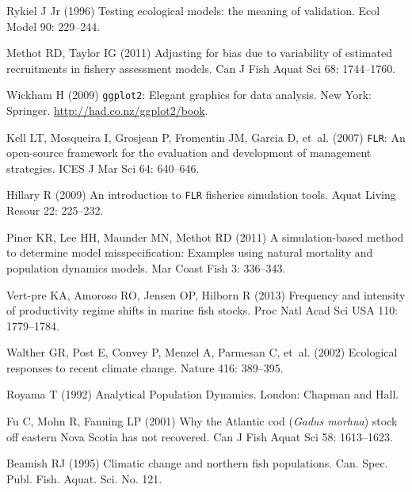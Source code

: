 \documentclass[11pt]{article}
\begin{document}
\begin{thebibliography}{10}
Rykiel J Jr (1996) Testing ecological models: the meaning of validation.
\newblock Ecol Model 90: 229--244.

Methot RD, Taylor IG (2011) Adjusting for bias due to variability of estimated
  recruitments in fishery assessment models.
\newblock Can J Fish Aquat Sci 68: 1744--1760.

Wickham H (2009) \texttt{ggplot2}: Elegant graphics for data analysis.
\newblock New York: Springer.
\newblock \urlprefix\url{http://had.co.nz/ggplot2/book}.

Kell LT, Mosqueira I, Grosjean P, Fromentin JM, Garcia D, et~al. (2007)
  \texttt{{FLR}}: An open-source framework for the evaluation and development
  of management strategies.
\newblock ICES J Mar Sci 64: 640--646.

Hillary R (2009) An introduction to \texttt{{FLR}} fisheries simulation tools.
\newblock Aquat Living Resour 22: 225--232.

Piner KR, Lee HH, Maunder MN, Methot RD (2011) A simulation-based method to
  determine model misspecification: Examples using natural mortality and
  population dynamics models.
\newblock Mar Coast Fish 3: 336--343.

Vert-pre KA, Amoroso RO, Jensen OP, Hilborn R (2013) Frequency and intensity of
  productivity regime shifts in marine fish stocks.
\newblock Proc Natl Acad Sci USA 110: 1779--1784.

Walther GR, Post E, Convey P, Menzel A, Parmesan C, et~al. (2002) Ecological
  responses to recent climate change.
\newblock Nature 416: 389--395.

Royama T (1992) Analytical Population Dynamics.
\newblock London: Chapman and Hall.

Fu C, Mohn R, Fanning LP (2001) Why the {Atlantic cod} (\textit{Gadus morhua})
  stock off eastern {Nova Scotia} has not recovered.
\newblock Can J Fish Aquat Sci 58: 1613--1623.

Beamish RJ (1995) Climatic change and northern fish populations.
\newblock Can. Spec. Publ. Fish. Aquat. Sci. No. 121.


\end{thebibliography}
\end{document}
